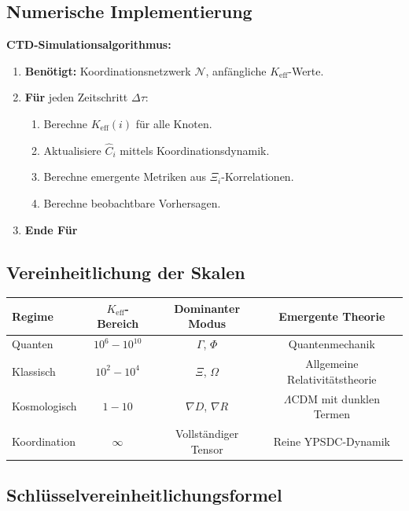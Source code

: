 \documentclass[11pt,a4paper]{article}
\begin{document}
	\subsection{Numerische Implementierung}
	
	\textbf{CTD-Simulationsalgorithmus:}
	\begin{enumerate}
		\item \textbf{Benötigt:} Koordinationsnetzwerk $\mathcal{N}$, anfängliche $K_{\mathrm{eff}}$-Werte.
		\item \textbf{Für} jeden Zeitschritt $\Delta\tau$:
		\begin{enumerate}
			\item Berechne $K_{\mathrm{eff}}(i)$ für alle Knoten.
			\item Aktualisiere $\hat{C}_i$ mittels Koordinationsdynamik.
			\item Berechne emergente Metriken aus $\Xi_i$-Korrelationen.
			\item Berechne beobachtbare Vorhersagen.
		\end{enumerate}
		\item \textbf{Ende Für}
	\end{enumerate}
	
	\subsection{Vereinheitlichung der Skalen}
	
	\begin{table}[htbp]
		\centering
		\begin{tabular}{lccc}
			\toprule
			\textbf{Regime} & \textbf{$K_{\mathrm{eff}}$-Bereich} & \textbf{Dominanter Modus} & \textbf{Emergente Theorie} \\
			\midrule
			Quanten & $10^6-10^{10}$ & $\Gamma$, $\Phi$ & Quantenmechanik \\
			Klassisch & $10^2-10^4$ & $\Xi$, $\Omega$ & Allgemeine Relativitätstheorie \\
			Kosmologisch & $1-10$ & $\nabla D$, $\nabla R$ & $\Lambda$CDM mit dunklen Termen \\
			Koordination & $\infty$ & Vollständiger Tensor & Reine YPSDC-Dynamik \\
			\bottomrule
		\end{tabular}
	\end{table}
	
	\subsection{Schlüsselvereinheitlichungsformel}
	
\end{document}
